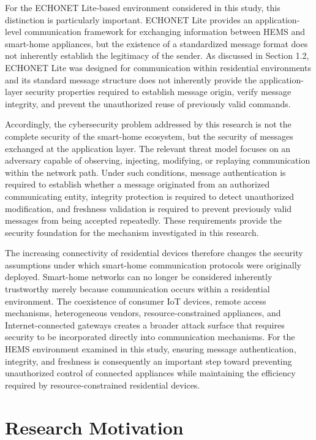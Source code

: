 For the ECHONET Lite-based environment considered in this study, this distinction is particularly important. ECHONET Lite provides an application-level communication framework for exchanging information between HEMS and smart-home appliances, but the existence of a standardized message format does not inherently establish the legitimacy of the sender. As discussed in Section 1.2, ECHONET Lite was designed for communication within residential environments and its standard message structure does not inherently provide the application-layer security properties required to establish message origin, verify message integrity, and prevent the unauthorized reuse of previously valid commands.

Accordingly, the cybersecurity problem addressed by this research is not the complete security of the smart-home ecosystem, but the security of messages exchanged at the application layer. The relevant threat model focuses on an adversary capable of observing, injecting, modifying, or replaying communication within the network path. Under such conditions, message authentication is required to establish whether a message originated from an authorized communicating entity, integrity protection is required to detect unauthorized modification, and freshness validation is required to prevent previously valid messages from being accepted repeatedly. These requirements provide the security foundation for the mechanism investigated in this research.

The increasing connectivity of residential devices therefore changes the security assumptions under which smart-home communication protocols were originally deployed. Smart-home networks can no longer be considered inherently trustworthy merely because communication occurs within a residential environment. The coexistence of consumer IoT devices, remote access mechanisms, heterogeneous vendors, resource-constrained appliances, and Internet-connected gateways creates a broader attack surface that requires security to be incorporated directly into communication mechanisms. For the HEMS environment examined in this study, ensuring message authentication, integrity, and freshness is consequently an important step toward preventing unauthorized control of connected appliances while maintaining the efficiency required by resource-constrained residential devices.

\section{Research Motivation}


